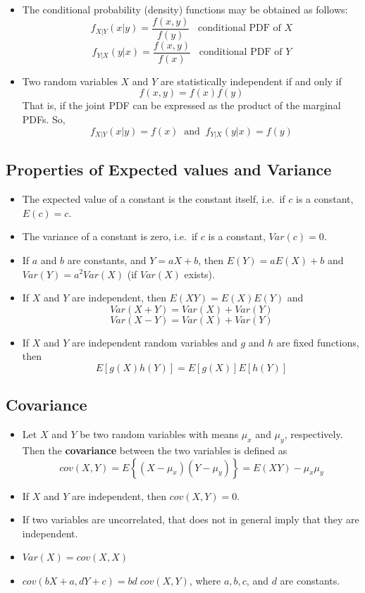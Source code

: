 \documentclass[
]{article}
\providecommand{\tightlist}{%
  \setlength{\itemsep}{0pt}\setlength{\parskip}{0pt}}
\begin{document}
\begin{itemize}
\tightlist
\item
  The conditional probability (density) functions may be obtained as
  follows:
  \[f_{X|Y}(x|y)=\frac{f(x,y)}{f(y)}\;\;\;\text{conditional PDF of $X$}\]
  \[f_{Y|X}(y|x)=\frac{f(x,y)}{f(x)}\;\;\;\text{conditional PDF of $Y$}\]
\item
  Two random variables \(X\) and \(Y\) are statistically independent if
  and only if \[f(x,y)=f(x)f(y)\] That is, if the joint PDF can be
  expressed as the product of the marginal PDFs. So,
  \[f_{X|Y}(x|y)=f(x)\;\;\text{and}\;\;f_{Y|X}(y|x)=f(y)\]
\end{itemize}

\hypertarget{properties-of-expected-values-and-variance}{%
\subsection{Properties of Expected values and
Variance}\label{properties-of-expected-values-and-variance}}

\begin{itemize}
\item
  The expected value of a constant is the constant itself, i.e.~if \(c\)
  is a constant, \(E(c)=c\).
\item
  The variance of a constant is zero, i.e.~if \(c\) is a constant,
  \(Var(c)=0\).
\item
  If \(a\) and \(b\) are constants, and \(Y = aX + b\), then
  \(E(Y)=a E(X)+b\) and \(Var(Y) = a^2Var(X)\) (if \(Var(X)\) exists).
\item
  If \(X\) and \(Y\) are independent, then \(E(XY) = E(X)E(Y)\) and
  \[Var(X+ Y)=Var(X) + Var(Y)\] \[Var(X- Y)=Var(X) + Var(Y)\]
\item
  If \(X\) and \(Y\) are independent random variables and \(g\) and
  \(h\) are fixed functions, then \[E[g(X)h(Y )] = E[g(X)]E[h(Y )]\]
\end{itemize}

\hypertarget{covariance}{%
\subsection{Covariance}\label{covariance}}

\begin{itemize}
\tightlist
\item
  Let \(X\) and \(Y\) be two random variables with means \(\mu_x\) and
  \(\mu_y\), respectively. Then the \textbf{covariance} between the two
  variables is defined as
  \[cov(X,Y)=E\left\{(X-\mu_x)(Y-\mu_y)\right\}=E(XY)-\mu_x\mu_y\]
\item
  If \(X\) and \(Y\) are independent, then \(cov(X,Y)=0\).
\item
  If two variables are uncorrelated, that does not in general imply that
  they are independent.
\item
  \(Var(X)=cov(X,X)\)
\item
  \(cov(bX+a, dY+c)=bd\; cov(X,Y)\), where \(a,b,c\), and \(d\) are
  constants.
\end{itemize}
\end{document}
